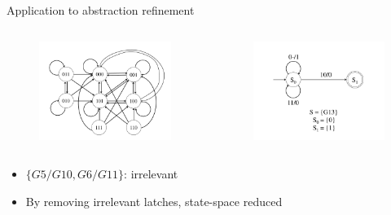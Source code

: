 \documentclass[xcolor=dvipsnames]{beamer}
\newcommand{\bi}{\begin{itemize}}
\newcommand{\ei}{\end{itemize}}
\begin{document}
\begin{frame}{\large{Application to abstraction refinement}}
\vspace{-0.1in}
\begin{columns}[onlytextwidth]
\begin{column}{0.5\textwidth}
\begin{figure}
\centering
\includegraphics[scale=0.25]{../newfig/s27_stg.pdf}
\end{figure}
\end{column}
\begin{column}{0.5\textwidth}
\begin{figure}
\centering
\includegraphics[scale=0.25]{../newfig/s27_stg_refined.pdf}
\end{figure}
\end{column}
\end{columns}
\bi
\item $\{G5/G10 ,G6/G11\}$: irrelevant
\item By removing irrelevant latches, state-space reduced
\ei
\end{frame}
\end{document}

